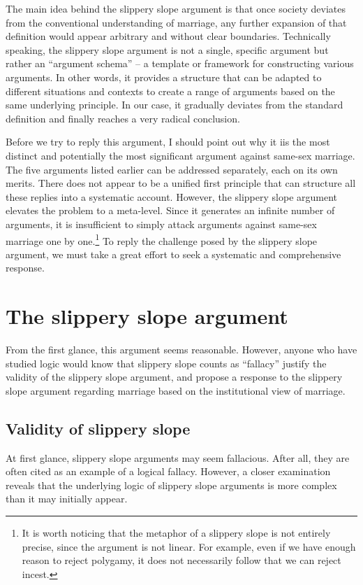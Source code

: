 \documentclass{article}
\begin{document}
The main idea behind the slippery slope argument is that once society deviates from the conventional understanding of marriage, any further expansion of that definition would appear arbitrary and without clear boundaries. Technically speaking, the slippery slope argument is not a single, specific argument but rather an ``argument schema'' -- a template or framework for constructing various arguments. In other words, it provides a structure that can be adapted to different situations and contexts to create a range of arguments based on the same underlying principle. In our case, it gradually deviates from the standard definition and finally reaches a very radical conclusion.

Before we try to reply this argument, I should point out why it iis the most distinct and potentially the most significant argument against same-sex marriage. The five arguments listed earlier can be addressed separately, each on its own merits. There does not appear to be a unified first principle that can structure all these replies into a systematic account. However, the slippery slope argument elevates the problem to a meta-level. Since it generates an infinite number of arguments, it is insufficient to simply attack arguments against same-sex marriage one by one.\footnote{It is worth noticing that the metaphor of a slippery slope is not entirely precise, since the argument is not linear. For example, even if we have enough reason to reject polygamy, it does not necessarily follow that we can reject incest.} To reply the challenge posed by the slippery slope argument, we must take a great effort to seek a systematic and comprehensive response.

\section{The slippery slope argument}

From the first glance, this argument seems reasonable. However, anyone who have studied logic would know that slippery slope counts as ``fallacy'' justify the validity of the slippery slope argument, and propose a response to the slippery slope argument regarding marriage based on the institutional view of marriage.

\subsection{Validity of slippery slope}

At first glance, slippery slope arguments may seem fallacious. After all, they are often cited as an example of a logical fallacy. However, a closer examination reveals that the underlying logic of slippery slope arguments is more complex than it may initially appear.
\end{document}
